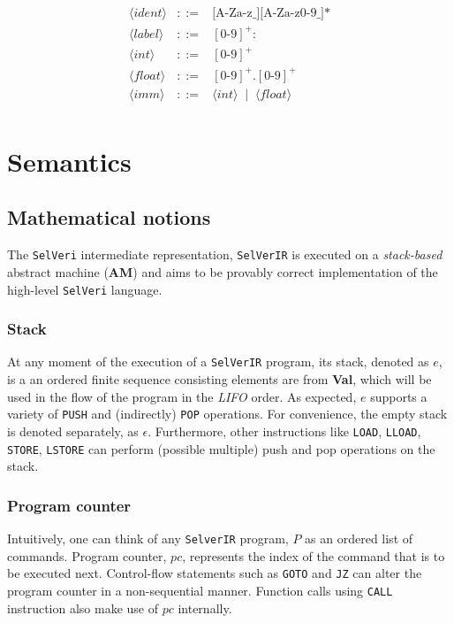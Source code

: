\documentclass{article}
\begin{document}
\[\begin{array}{rcl}
\langle \mathit{ident} \rangle &::=& \text{[A-Za-z\_][A-Za-z0-9\_]*} \\[6pt]

\langle \mathit{label} \rangle &::=& [0\texttt{-}9]^+ \texttt{:}\\[6pt]

\langle \mathit{int} \rangle &::=& [0\texttt{-}9]^+ \\[6pt]

\langle \mathit{float} \rangle &::=& [0\texttt{-}9]^+\texttt{.}[0\texttt{-}9]^+ \\[6pt]

\langle \mathit{imm} \rangle &::=& \langle \mathit{int} \rangle \;\mid\; \langle \mathit{float} \rangle \\[6pt]

\end{array}
\]

\newpage
\section{Semantics}

\subsection{Mathematical notions}
The \texttt{SelVeri} intermediate representation, \texttt{SelVerIR} is executed on a \textit{stack-based} abstract machine (\textbf{AM}) and aims to be provably correct implementation of the high-level \texttt{SelVeri} language.

\subsubsection{Stack}
At any moment of the execution of a \texttt{SelVerIR} program, its stack, denoted as $e$, is a an ordered finite sequence consisting elements are from \textbf{Val}, which will be used in the flow of the program in the \textit{LIFO} order. As expected, $e$ supports a variety of \texttt{PUSH} and (indirectly) \texttt{POP} operations. For convenience, the empty stack is denoted separately, as $\epsilon$. Furthermore, other instructions like \texttt{LOAD}, \texttt{LLOAD}, \texttt{STORE}, \texttt{LSTORE} can perform (possible multiple) push and pop operations on the stack.

\subsubsection{Program counter}
Intuitively, one can think of any \texttt{SelverIR} program, $P$ as an ordered list of commands. Program counter, $pc$, represents the index of the command that is to be executed next. Control-flow statements such as \texttt{GOTO} and \texttt{JZ} can alter the program counter in a non-sequential manner. Function calls using \texttt{CALL} instruction also make use of $pc$ internally.
\end{document}
